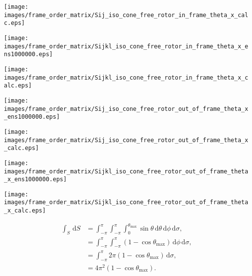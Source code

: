 \documentclass[a4paper,11pt,twoside,openright]{book}
\def\lthtmlcheckvsize{\ifdim\ht\sizebox<\vsize 
  \ifdim\wd\sizebox<\hsize\expandafter\hfill\fi \expandafter\vfill
  \else\expandafter\vss\fi}%
\begin{document}
{\newpage\clearpage
{}%
\texttt{[image: images/frame\_order\_matrix/Sij\_iso\_cone\_free\_rotor\_in\_frame\_theta\_x\_calc.eps]}%
\lthtmlpictureZ
\lthtmlcheckvsize\clearpage}

{\newpage\clearpage
{}%
\texttt{[image: images/frame\_order\_matrix/Sijkl\_iso\_cone\_free\_rotor\_in\_frame\_theta\_x\_ens1000000.eps]}%
\lthtmlpictureZ
\lthtmlcheckvsize\clearpage}

{\newpage\clearpage
{}%
\texttt{[image: images/frame\_order\_matrix/Sijkl\_iso\_cone\_free\_rotor\_in\_frame\_theta\_x\_calc.eps]}%
\lthtmlpictureZ
\lthtmlcheckvsize\clearpage}

{\newpage\clearpage
{}%
\texttt{[image: images/frame\_order\_matrix/Sij\_iso\_cone\_free\_rotor\_out\_of\_frame\_theta\_x\_ens1000000.eps]}%
\lthtmlpictureZ
\lthtmlcheckvsize\clearpage}

{\newpage\clearpage
{}%
\texttt{[image: images/frame\_order\_matrix/Sij\_iso\_cone\_free\_rotor\_out\_of\_frame\_theta\_x\_calc.eps]}%
\lthtmlpictureZ
\lthtmlcheckvsize\clearpage}

{\newpage\clearpage
{}%
\texttt{[image: images/frame\_order\_matrix/Sijkl\_iso\_cone\_free\_rotor\_out\_of\_frame\_theta\_x\_ens1000000.eps]}%
\lthtmlpictureZ
\lthtmlcheckvsize\clearpage}

{\newpage\clearpage
{}%
\texttt{[image: images/frame\_order\_matrix/Sijkl\_iso\_cone\_free\_rotor\_out\_of\_frame\_theta\_x\_calc.eps]}%
\lthtmlpictureZ
\lthtmlcheckvsize\clearpage}

{\newpage\clearpage
\setcounter{equation}{34}
%
\begin{subequations}\begin{align}
\int_S \,\mathrm{d}S &= \int_{-\pi}^{\pi} \int_{-\pi}^{\pi} \int_{0}^{\theta_{\textrm{max}}} \sin\theta \,\mathrm{d}\theta \,\mathrm{d}\phi \,\mathrm{d}\sigma , \\
&= \int_{-\pi}^{\pi} \int_{-\pi}^{\pi} \left( 1 - \cos\theta_{\textrm{max}}\right) \,\mathrm{d}\phi \,\mathrm{d}\sigma , \\
&= \int_{-\pi}^{\pi} 2\pi \left( 1 - \cos\theta_{\textrm{max}}\right) \,\mathrm{d}\sigma , \\
&= 4\pi^2 \left( 1 - \cos\theta_{\textrm{max}}\right) .
\end{align}\end{subequations}%
\lthtmldisplayZ
\lthtmlcheckvsize\clearpage}
\end{document}
